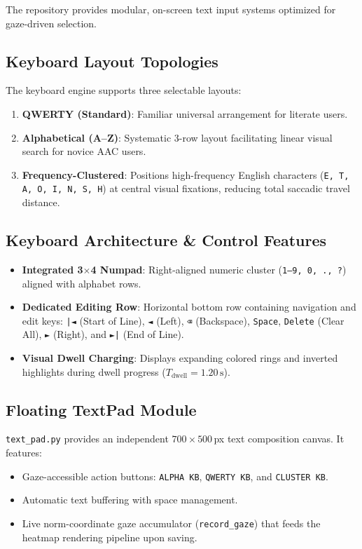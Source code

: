 \documentclass[11pt,a4paper]{article}
\begin{document}
The repository provides modular, on-screen text input systems optimized for gaze-driven selection.

\subsection{Keyboard Layout Topologies}
The keyboard engine supports three selectable layouts:
\begin{enumerate}
    \item \textbf{QWERTY (Standard)}: Familiar universal arrangement for literate users.
    \item \textbf{Alphabetical (A--Z)}: Systematic 3-row layout facilitating linear visual search for novice AAC users.
    \item \textbf{Frequency-Clustered}: Positions high-frequency English characters (\texttt{E, T, A, O, I, N, S, H}) at central visual fixations, reducing total saccadic travel distance.
\end{enumerate}

\subsection{Keyboard Architecture \& Control Features}
\begin{itemize}
    \item \textbf{Integrated 3$\times$4 Numpad}: Right-aligned numeric cluster (\texttt{1--9, 0, ., ?}) aligned with alphabet rows.
    \item \textbf{Dedicated Editing Row}: Horizontal bottom row containing navigation and edit keys: \texttt{|◄} (Start of Line), \texttt{◄} (Left), \texttt{⌫} (Backspace), \texttt{Space}, \texttt{Delete} (Clear All), \texttt{►} (Right), and \texttt{►|} (End of Line).
    \item \textbf{Visual Dwell Charging}: Displays expanding colored rings and inverted highlights during dwell progress ($T_{\text{dwell}} = 1.20\,\text{s}$).
\end{itemize}

\subsection{Floating TextPad Module}
\texttt{text\_pad.py} provides an independent $700 \times 500$\,px text composition canvas. It features:
\begin{itemize}
    \item Gaze-accessible action buttons: \texttt{ALPHA KB}, \texttt{QWERTY KB}, and \texttt{CLUSTER KB}.
    \item Automatic text buffering with space management.
    \item Live norm-coordinate gaze accumulator (\texttt{record\_gaze}) that feeds the heatmap rendering pipeline upon saving.
\end{itemize}
\end{document}
